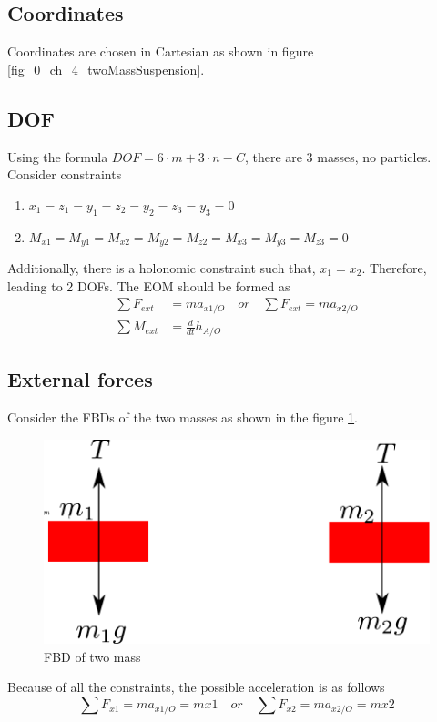 \subsection{Coordinates}
Coordinates are chosen in Cartesian as shown in figure \ref{fig_0_ch_4_twoMassSuspension}. 

\subsection{DOF}
Using the formula $DOF = 6\cdot m + 3 \cdot n - C$, there are 3 masses, no particles. Consider constraints
\begin{enumerate}
	\item $x_{1} = z_{1} = y_{1} = z_{2} = y_{2} = z_{3} = y_{3} = 0$
	\item $M_{x1} = M_{y1} = M_{x2} = M_{y2} = M_{z2} = M_{x3} = M_{y3} = M_{z3}  = 0$
\end{enumerate}
Additionally, there is a holonomic constraint such that, $x_{1} = x_{2}$. Therefore, leading to 2 DOFs. The EOM should be formed as
\begin{align}
	\sum F_{ext} &= m a_{x1/O} \quad or \quad \sum F_{ext} = m a_{x2/O} \\
	\sum M_{ext} &= \frac{d}{dt}h_{A/O}
\end{align}

\subsection{External forces}

Consider the FBDs of the two masses as shown in the figure \ref{fig_0_ch_4_twoMassSuspension_FBD_masses}.
\begin{figure}[h!]
	\centering
	\includegraphics[width=0.5\linewidth]{Bilder/25_TwoMassSuspension_FBD_Masses.pdf}
	\caption{FBD of two mass}
	\label{fig_0_ch_4_twoMassSuspension_FBD_masses}
\end{figure}

Because of all the constraints, the possible acceleration is as follows
\begin{equation}
	\sum F_{x1} = m a_{x1/O} = m \ddot{x1} \quad or \quad \sum F_{x2} = m a_{x2/O} = m \ddot{x2}
\end{equation}

